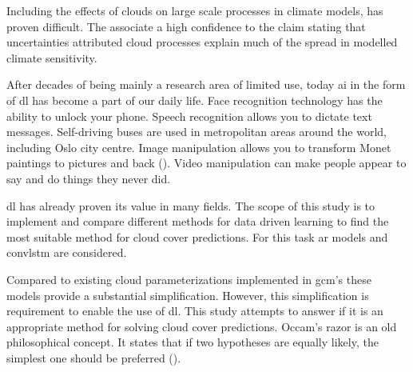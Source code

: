 
Including the effects of clouds on large scale processes in climate models, has proven difficult. The  associate a high confidence to the claim stating that uncertainties attributed cloud processes explain much of the spread in modelled climate sensitivity. 

After decades of being mainly a research area of limited use, today \acrfull{ai} in the form of \acrfull{dl} has become a part of our daily life. Face recognition technology has the ability to unlock your phone. Speech recognition allows you to dictate text messages. %
Self-driving buses are used in metropolitan areas around the world, including Oslo city centre.  %
Image manipulation allows you to transform Monet paintings to pictures and back (\cite{zhu2017_cycleGAN_monet_zebra}). Video manipulation can make people appear to say and do things they never did. 

\acrshort{dl} has already proven its value in many fields. The scope of this study is to implement and compare different methods for data driven learning to find the most suitable method for cloud cover predictions. For this task \acrfull{ar} models and \acrfull{convlstm} are considered. 

Compared to existing cloud parameterizations implemented in \acrshort{gcm}'s these models provide a substantial simplification.
However, this simplification is requirement to enable the use of \acrshort{dl}. This study attempts to answer if it is an appropriate method for solving cloud cover predictions.
Occam's razor is an old philosophical concept. It states that if two hypotheses are equally likely, the simplest one should be preferred (\cite{noauthor_occams_nodate}). 

